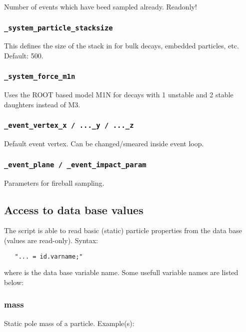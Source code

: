 {Number of events which have beed sampled already. Readonly!

\subsubsection{\texttt{\_system\_particle\_stacksize}} 

This defines the size of the stack in  for bulk decays, embedded particles, etc.
Default: 500.

\subsubsection{\texttt{\_system\_force\_m1n}}

Uses the ROOT based model M1N for decays with 1 unstable and 2 stable daughters
instead of M3.

\subsubsection{\texttt{\_event\_vertex\_x / ...\_y / ...\_z}}

Default event vertex. Can be changed/smeared inside event loop.

\subsubsection{\texttt{\_event\_plane / \_event\_impact\_param}}

Parameters for fireball sampling.

\subsection{Access to data base values}

The script is able to read basic (static) particle properties from the
data base (values are read-only). Syntax:

\begin{verbatim}
   "... = id.varname;"
\end{verbatim}

where  is the data base variable name.  Some usefull
variable names are listed below:

\subsubsection{mass} 

Static pole mass of a particle. Example(s):

}
